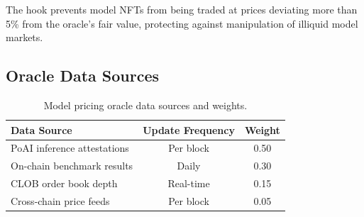The hook prevents model NFTs from being traded at prices deviating more than 5\% from the oracle's fair value, protecting against manipulation of illiquid model markets.

\subsection{Oracle Data Sources}

\begin{table}[t]
\centering
\begin{tabular}{lcc}
\toprule
\textbf{Data Source} & \textbf{Update Frequency} & \textbf{Weight} \\
\midrule
PoAI inference attestations & Per block & 0.50 \\
On-chain benchmark results & Daily & 0.30 \\
CLOB order book depth & Real-time & 0.15 \\
Cross-chain price feeds & Per block & 0.05 \\
\bottomrule
\end{tabular}
\caption{Model pricing oracle data sources and weights.}
\label{tab:oracle}
\end{table}

